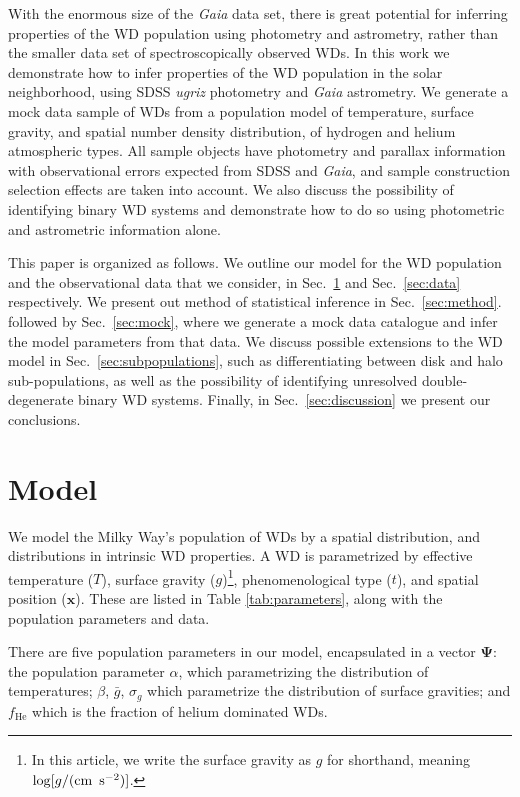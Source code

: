 \documentclass[fleqn,usenatbib]{mnras}
\newcommand{\popp}{\boldsymbol{\Psi}}
\newcommand{\Teff}{T}
\newcommand{\logg}{g}
\begin{document}
With the enormous size of the \emph{Gaia} data set, there is great potential for inferring properties of the WD population using photometry and astrometry, rather than the smaller data set of spectroscopically observed WDs. In this work we demonstrate how to infer properties of the WD population in the solar neighborhood, using SDSS \emph{ugriz} photometry and \emph{Gaia} astrometry. We generate a mock data sample of WDs from a population model of temperature, surface gravity, and spatial number density distribution, of hydrogen and helium atmospheric types. All sample objects have photometry and parallax information with observational errors expected from SDSS and \emph{Gaia}, and sample construction selection effects are taken into account. We also discuss the possibility of identifying binary WD systems and demonstrate how to do so using photometric and astrometric information alone.

This paper is organized as follows. We outline our model for the WD population and the observational data that we consider, in Sec.~\ref{sec:model} and Sec.~\ref{sec:data} respectively. We present out method of statistical inference in Sec.~\ref{sec:method}.  followed by Sec.~\ref{sec:mock}, where we generate a mock data catalogue and infer the model parameters from that data. We discuss possible extensions to the WD model in Sec.~\ref{sec:subpopulations}, such as differentiating between disk and halo sub-populations, as well as the possibility of identifying unresolved double-degenerate binary WD systems. Finally, in Sec.~\ref{sec:discussion} we present our conclusions.





\section{Model}\label{sec:model}

We model the Milky Way's population of WDs by a spatial distribution, and distributions in intrinsic WD properties. A WD is parametrized by effective temperature ($\Teff$), surface gravity ($\logg$)\footnote{In this article, we write the surface gravity as $g$ for shorthand, meaning $\log[g/(\text{cm\, s}^{-2})]$.}, phenomenological type ($t$), and spatial position ($\mathbf{x}$). These are listed in Table \ref{tab:parameters}, along with the population parameters and data.

There are five population parameters in our model, encapsulated in a vector $\popp$: the population parameter $\alpha$, which parametrizing the distribution of temperatures; $\beta$, $\bar{g}$, $\sigma_g$ which parametrize the distribution of surface gravities; and $f_\text{He}$ which is the fraction of helium dominated WDs.
\end{document}
